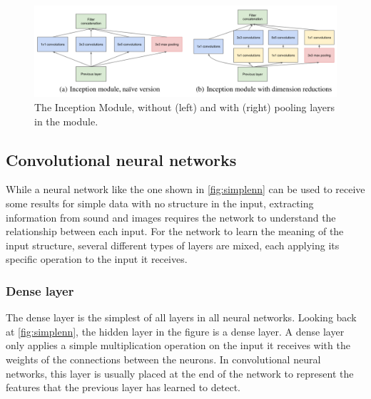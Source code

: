 \begin{figure}[htbp]  %
  \centering
  \includegraphics[width=.8\textwidth]{figures/google2.PNG}
  \caption{The Inception Module\cite{szegedy2014going}, without (left) and with (right) pooling layers in the module.}
  \label{fig:inception}
\end{figure}

\subsection{Convolutional neural networks}

While a neural network like the one shown in \cref{fig:simplenn} can be used to receive some results for simple data with no structure in the input, extracting information from sound and images requires the network to understand the relationship between each input. 
For the network to learn the meaning of the input structure, several different types of layers are mixed, each applying its specific operation to the input it receives.




\subsubsection{Dense layer}
The dense layer is the simplest of all layers in all neural networks.
Looking back at \cref{fig:simplenn}, the hidden layer in the figure is a dense layer.
A dense layer only applies a simple multiplication operation on the input it receives with the weights of the connections between the neurons.
In convolutional neural networks, this layer is usually placed at the end of the network to represent the features that the previous layer has learned to detect.



